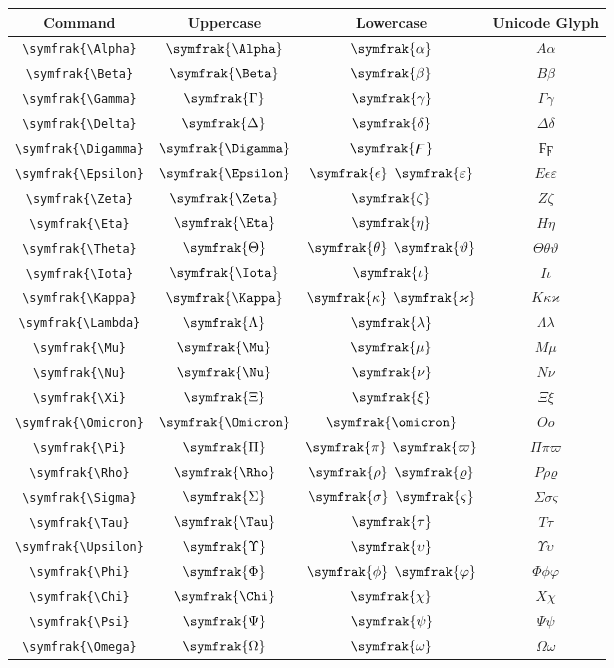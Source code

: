 \documentclass[12pt,a4paper]{article}
\begin{document}
\begin{longtable}{|c|c|c|c|}
\hline
\textbf{Command} & \textbf{Uppercase} & \textbf{Lowercase} & \textbf{Unicode Glyph} \\
\hline
\verb|\symfrak{\Alpha}| & $\symfrak{\Alpha}$ & $\symfrak{\alpha}$ & $ Α 𝛼 $ \\
\verb|\symfrak{\Beta}| & $\symfrak{\Beta}$ & $\symfrak{\beta}$ & $ Β 𝛽 $ \\
\verb|\symfrak{\Gamma}| & $\symfrak{\Gamma}$ & $\symfrak{\gamma}$ & $ Γ 𝛾 $ \\
\verb|\symfrak{\Delta}| & $\symfrak{\Delta}$ & $\symfrak{\delta}$ & $ Δ 𝛿 $ \\
\verb|\symfrak{\Digamma}| & $\symfrak{\Digamma}$ & $\symfrak{\digamma}$ & $ Ϝ ϝ $ \\
\verb|\symfrak{\Epsilon}| & $\symfrak{\Epsilon}$ & $\symfrak{\epsilon}$ $\symfrak{\varepsilon}$ & $ Ε 𝜖 𝜀 $ \\
\verb|\symfrak{\Zeta}| & $\symfrak{\Zeta}$ & $\symfrak{\zeta}$ & $ Ζ 𝜁 $ \\
\verb|\symfrak{\Eta}| & $\symfrak{\Eta}$ & $\symfrak{\eta}$ & $ Η 𝜂 $ \\
\verb|\symfrak{\Theta}| & $\symfrak{\Theta}$ & $\symfrak{\theta}$ $\symfrak{\vartheta}$ & $ Θ 𝜃 𝜗 $ \\
\verb|\symfrak{\Iota}| & $\symfrak{\Iota}$ & $\symfrak{\iota}$ & $ Ι 𝜄 $ \\
\verb|\symfrak{\Kappa}| & $\symfrak{\Kappa}$ & $\symfrak{\kappa}$ $\symfrak{\varkappa}$ & $ Κ 𝜅 𝜘 $ \\
\verb|\symfrak{\Lambda}| & $\symfrak{\Lambda}$ & $\symfrak{\lambda}$ & $ Λ 𝜆 $ \\
\verb|\symfrak{\Mu}| & $\symfrak{\Mu}$ & $\symfrak{\mu}$ & $ Μ 𝜇 $ \\
\verb|\symfrak{\Nu}| & $\symfrak{\Nu}$ & $\symfrak{\nu}$ & $ Ν 𝜈 $ \\
\verb|\symfrak{\Xi}| & $\symfrak{\Xi}$ & $\symfrak{\xi}$ & $ Ξ 𝜉 $ \\
\verb|\symfrak{\Omicron}| & $\symfrak{\Omicron}$ & $\symfrak{\omicron}$ & $ Ο 𝜊 $ \\
\verb|\symfrak{\Pi}| & $\symfrak{\Pi}$ & $\symfrak{\pi}$ $\symfrak{\varpi}$ & $ Π 𝜋 𝜛 $ \\
\verb|\symfrak{\Rho}| & $\symfrak{\Rho}$ & $\symfrak{\rho}$ $\symfrak{\varrho}$ & $ Ρ 𝜌 𝜚 $ \\
\verb|\symfrak{\Sigma}| & $\symfrak{\Sigma}$ & $\symfrak{\sigma}$ $\symfrak{\varsigma}$ & $ Σ 𝜎 𝜍 $ \\
\verb|\symfrak{\Tau}| & $\symfrak{\Tau}$ & $\symfrak{\tau}$ & $ Τ 𝜏 $ \\
\verb|\symfrak{\Upsilon}| & $\symfrak{\Upsilon}$ & $\symfrak{\upsilon}$ & $ Υ 𝜐 $ \\
\verb|\symfrak{\Phi}| & $\symfrak{\Phi}$ & $\symfrak{\phi}$ $\symfrak{\varphi}$ & $ Φ 𝜙 𝜑 $ \\
\verb|\symfrak{\Chi}| & $\symfrak{\Chi}$ & $\symfrak{\chi}$ & $ Χ 𝜒 $ \\
\verb|\symfrak{\Psi}| & $\symfrak{\Psi}$ & $\symfrak{\psi}$ & $ Ψ 𝜓 $ \\
\verb|\symfrak{\Omega}| & $\symfrak{\Omega}$ & $\symfrak{\omega}$ & $ Ω 𝜔 $ \\
\hline
\end{longtable}
\end{document}
